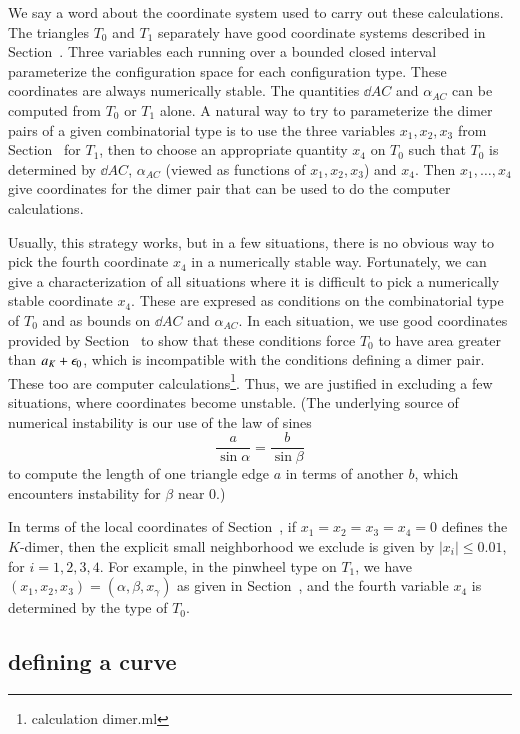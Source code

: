 We say a word about the coordinate system used to carry out these calculations.
The triangles $T_0$ and $T_1$ separately have good coordinate systems described in Section~.  Three variables
each running over a bounded closed interval parameterize the configuration space for each configuration type.
These coordinates are always numerically stable.  The quantities $\dd{A}{C}$ and $\alpha_{AC}$ can be computed from $T_0$ or $T_1$  alone.
A natural way to try to parameterize the dimer pairs of a given combinatorial type is to use the three variables $x_1,x_2,x_3$ from Section~ for $T_1$,
then to choose an appropriate quantity $x_4$ on $T_0$ such that $T_0$ is determined by $\dd{A}{C}$, $\alpha_{AC}$ (viewed as functions of $x_1,x_2,x_3$) and
$x_4$.  Then $x_1,\ldots,x_4$ give coordinates for the dimer pair that can be used to do the computer calculations.

Usually, this strategy works, but in a few situations, there is no obvious way to pick the fourth coordinate $x_4$ in a numerically stable way.
Fortunately, we can give a characterization of all situations where it is difficult to pick a numerically stable coordinate $x_4$.  These are
expresed as conditions on the combinatorial type of $T_0$ and as bounds on $\dd{A}{C}$ and $\alpha_{AC}$.  In each situation, we use good
coordinates provided by Section~ to show that
these conditions force $T_0$ to have area greater than $a_K+\epsilon_0$, which is incompatible with the conditions defining a dimer pair.  
These too are computer calculations\footnote{calculation dimer.ml}.
Thus, we are justified in excluding a few situations, where coordinates become unstable.  (The underlying source of numerical instability is
our use of the law of sines 
\[
\frac{a}{\sin\alpha} = \frac{b}{\sin\beta}
\]
to compute the length of one triangle edge $a$ in terms of another $b$, which encounters instability for $\beta$ near $0$.)

In terms of the local coordinates of Section~, if $x_1=x_2=x_3=x_4=0$ defines the $K$-dimer, then the explicit
small neighborhood we exclude is given by $|x_i|\le 0.01$, for $i=1,2,3,4$.  For example, in the pinwheel type on $T_1$, 
we have $(x_1,x_2,x_3)=(\alpha,\beta,x_\gamma)$ as given in Section~, and the fourth variable $x_4$ is determined
by the type of $T_0$.

\subsection{defining a curve}

